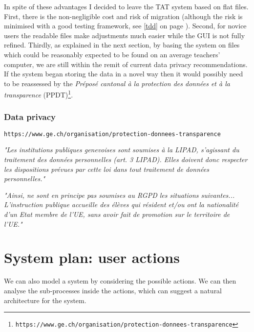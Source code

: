 \documentclass[10pt]{article}
\begin{document}
In spite of these advantages I decided to leave the TAT system based on flat files. First, there is the non-negligible cost and risk of migration (although the risk is minimised with a good testing framework, see \ref{tdd} on page \pageref{tdd}). Second, for novice users the readable files make adjustments much easier while the GUI is not fully refined. Thirdly, as explained in the next section, by basing the system on files which could be reasonably expected to be found on an average teachers' computer, we are still within the remit of current data privacy recommendations. If the system began storing the data in a novel way then it would possibly need to be reassessed by the \emph{Préposé cantonal à la protection des données et à la transparence} (PPDT)\footnote{\texttt{https://www.ge.ch/organisation/protection-donnees-transparence}}.

\subsubsection{Data privacy} \label{dataprivacy}

\texttt{https://www.ge.ch/organisation/protection-donnees-transparence}

\begin{center} 
\emph{"Les institutions publiques genevoises sont soumises à la LIPAD, s'agissant du traitement des données personnelles (art. 3 LIPAD). Elles doivent donc respecter les dispositions prévues par cette loi dans tout traitement de données personnelles."}\cite[p. 1]{PPDT18}
\end{center}

\begin{center} 
\emph{"Ainsi, ne sont en principe pas soumises au RGPD les situations suivantes... L’instruction publique accueille des élèves qui résident et/ou ont la nationalité d’un Etat membre de l’UE, sans avoir fait de promotion sur le territoire de l’UE."}\cite[p. 3]{PPDT18}
\end{center}




\iffalse
\section{System plan: user actions} \label{actions}

We can also model a system by considering the possible actions. We can then analyse the sub-processes inside the actions, which can suggest a natural architecture for the system.
\end{document}
